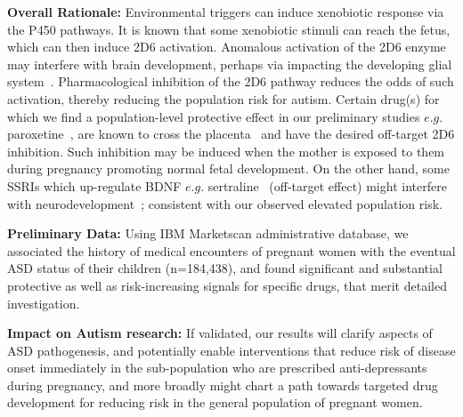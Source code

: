 \documentclass[onecolumn, compsoc,11pt]{IEEEtran}
\begin{document}
\textbf{Overall Rationale:} Environmental triggers can induce  xenobiotic response via the P450 pathways. It is known that some xenobiotic stimuli can reach the fetus, which can then induce 2D6 activation. Anomalous activation of the 2D6 enzyme may interfere with  brain development, perhaps via impacting the developing glial system~\cite{gzielo2021astroglia,kuban2021cytochrome}. Pharmacological inhibition of the 2D6 pathway reduces the odds of such  activation, thereby reducing the population risk for autism. Certain drug(s) for which we find a population-level protective effect in our preliminary studies $e.g.$ paroxetine~\cite{brosen1998differences},  are known to cross the placenta~\cite{brosen1998differences} and have the desired off-target 2D6 inhibition. Such inhibition may be induced when the mother is exposed to them during pregnancy promoting normal fetal development. On the other hand, some SSRIs which up-regulate BDNF $e.g.$ sertraline~\cite{brosen1998differences} (off-target effect) might  interfere with  neurodevelopment~\cite{kasarpalkar2014brain}; consistent with our observed elevated population risk. 

\textbf{Preliminary Data:} Using IBM Marketscan administrative database, we associated the history of medical encounters of pregnant women with the eventual ASD status of their children (n=184,438), and found significant and substantial protective as well as risk-increasing signals for specific drugs, that merit detailed investigation. %

\textbf{Impact on Autism research:} If validated, our results will clarify aspects of ASD pathogenesis, and potentially enable  interventions that reduce  risk of disease onset immediately in the sub-population  who are prescribed anti-depressants during pregnancy, and more broadly might chart a path towards targeted drug development for reducing  risk in the general population of pregnant women.
\end{document}
